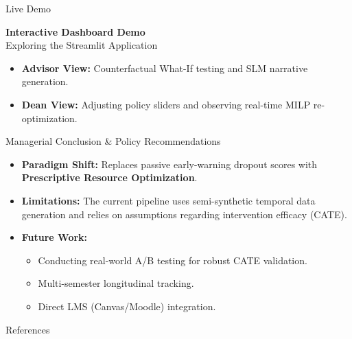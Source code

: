 \documentclass[aspectratio=169, 10pt]{beamer}
\begin{document}
\begin{frame}{Live Demo}
  \begin{center}
    \Huge \textbf{Interactive Dashboard Demo} \\
    \vspace{0.5cm}
    \Large Exploring the Streamlit Application
  \end{center}
  \vspace{0.5cm}
  \begin{itemize}
    \item \textbf{Advisor View:} Counterfactual What-If testing and SLM narrative generation.
    \item \textbf{Dean View:} Adjusting policy sliders and observing real-time MILP re-optimization.
  \end{itemize}
\end{frame}

\begin{frame}{Managerial Conclusion \& Policy Recommendations}
  \begin{itemize}
    \item \textbf{Paradigm Shift:} Replaces passive early-warning dropout scores with \textbf{Prescriptive Resource Optimization}.
    \item \textbf{Limitations:} The current pipeline uses semi-synthetic temporal data generation and relies on assumptions regarding intervention efficacy (CATE).
    \item \textbf{Future Work:} 
      \begin{itemize}
        \item Conducting real-world A/B testing for robust CATE validation.
        \item Multi-semester longitudinal tracking.
        \item Direct LMS (Canvas/Moodle) integration.
      \end{itemize}
  \end{itemize}
\end{frame}

\begin{frame}[allowframebreaks]{References}
  
  
\end{frame}
\end{document}

